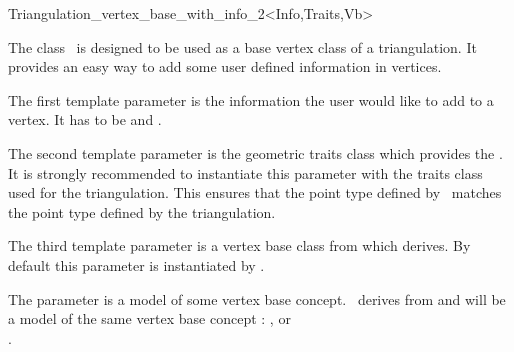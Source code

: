 

\begin{ccRefClass}{Triangulation_vertex_base_with_info_2<Info,Traits,Vb>}  %


\ccDefinition
  
The class \ccRefName\ is designed to be used as a base vertex class
of a triangulation. It provides an easy way to add some user defined information in vertices.


\ccParameters

The first template parameter is the information the user would like to add
to a vertex.  It has to be  and .

The second template parameter is the geometric traits class
which provides the . It is strongly 
recommended to instantiate this parameter
with the traits class used for   the triangulation.
This ensures that the point type defined by \ccRefName\
matches  the point type defined by 
the triangulation.

The third template parameter is a vertex base class from which
 derives.  By default
this parameter is instantiated by
.

\ccIsModel
The parameter  is a model of some vertex base concept.
\ccRefName\ derives from \ccc{Vb} and will be a model of the
same vertex base concept :
, or \\
.

\ccTypes
{}




\end{ccRefClass}
